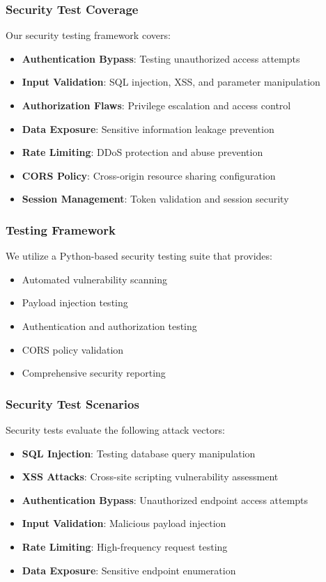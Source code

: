 \documentclass[a4paper,12pt]{article}
\begin{document}
\subsubsection{Security Test Coverage}
Our security testing framework covers:
\begin{itemize}
    \item \textbf{Authentication Bypass}: Testing unauthorized access attempts
    \item \textbf{Input Validation}: SQL injection, XSS, and parameter manipulation
    \item \textbf{Authorization Flaws}: Privilege escalation and access control
    \item \textbf{Data Exposure}: Sensitive information leakage prevention
    \item \textbf{Rate Limiting}: DDoS protection and abuse prevention
    \item \textbf{CORS Policy}: Cross-origin resource sharing configuration
    \item \textbf{Session Management}: Token validation and session security
\end{itemize}

\subsubsection{Testing Framework}
We utilize a Python-based security testing suite that provides:
\begin{itemize}
    \item Automated vulnerability scanning
    \item Payload injection testing
    \item Authentication and authorization testing
    \item CORS policy validation
    \item Comprehensive security reporting
\end{itemize}

\subsubsection{Security Test Scenarios}
Security tests evaluate the following attack vectors:
\begin{itemize}
    \item \textbf{SQL Injection}: Testing database query manipulation
    \item \textbf{XSS Attacks}: Cross-site scripting vulnerability assessment
    \item \textbf{Authentication Bypass}: Unauthorized endpoint access attempts
    \item \textbf{Input Validation}: Malicious payload injection
    \item \textbf{Rate Limiting}: High-frequency request testing
    \item \textbf{Data Exposure}: Sensitive endpoint enumeration
\end{itemize}
\end{document}
